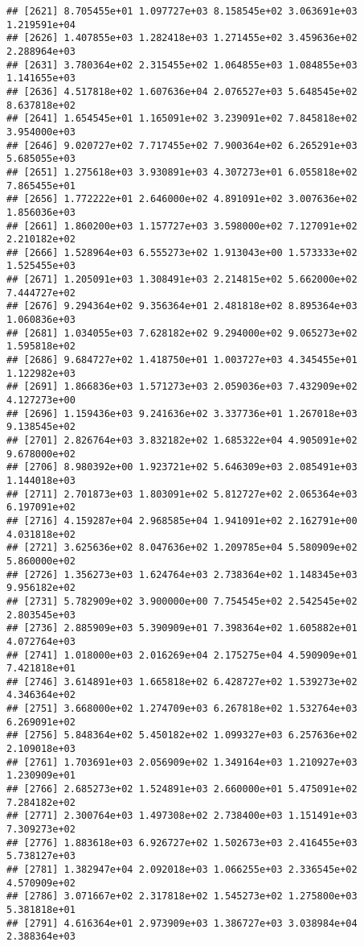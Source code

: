 \documentclass[]{article}
\begin{document}
\begin{verbatim}
## [2621] 8.705455e+01 1.097727e+03 8.158545e+02 3.063691e+03 1.219591e+04
## [2626] 1.407855e+03 1.282418e+03 1.271455e+02 3.459636e+02 2.288964e+03
## [2631] 3.780364e+02 2.315455e+02 1.064855e+03 1.084855e+03 1.141655e+03
## [2636] 4.517818e+02 1.607636e+04 2.076527e+03 5.648545e+02 8.637818e+02
## [2641] 1.654545e+01 1.165091e+02 3.239091e+02 7.845818e+02 3.954000e+03
## [2646] 9.020727e+02 7.717455e+02 7.900364e+02 6.265291e+03 5.685055e+03
## [2651] 1.275618e+03 3.930891e+03 4.307273e+01 6.055818e+02 7.865455e+01
## [2656] 1.772222e+01 2.646000e+02 4.891091e+02 3.007636e+02 1.856036e+03
## [2661] 1.860200e+03 1.157727e+03 3.598000e+02 7.127091e+02 2.210182e+02
## [2666] 1.528964e+03 6.555273e+02 1.913043e+00 1.573333e+02 1.525455e+03
## [2671] 1.205091e+03 1.308491e+03 2.214815e+02 5.662000e+02 7.444727e+02
## [2676] 9.294364e+02 9.356364e+01 2.481818e+02 8.895364e+03 1.060836e+03
## [2681] 1.034055e+03 7.628182e+02 9.294000e+02 9.065273e+02 1.595818e+02
## [2686] 9.684727e+02 1.418750e+01 1.003727e+03 4.345455e+01 1.122982e+03
## [2691] 1.866836e+03 1.571273e+03 2.059036e+03 7.432909e+02 4.127273e+00
## [2696] 1.159436e+03 9.241636e+02 3.337736e+01 1.267018e+03 9.138545e+02
## [2701] 2.826764e+03 3.832182e+02 1.685322e+04 4.905091e+02 9.678000e+02
## [2706] 8.980392e+00 1.923721e+02 5.646309e+03 2.085491e+03 1.144018e+03
## [2711] 2.701873e+03 1.803091e+02 5.812727e+02 2.065364e+03 6.197091e+02
## [2716] 4.159287e+04 2.968585e+04 1.941091e+02 2.162791e+00 4.031818e+02
## [2721] 3.625636e+02 8.047636e+02 1.209785e+04 5.580909e+02 5.860000e+02
## [2726] 1.356273e+03 1.624764e+03 2.738364e+02 1.148345e+03 9.956182e+02
## [2731] 5.782909e+02 3.900000e+00 7.754545e+02 2.542545e+02 2.803545e+03
## [2736] 2.885909e+03 5.390909e+01 7.398364e+02 1.605882e+01 4.072764e+03
## [2741] 1.018000e+03 2.016269e+04 2.175275e+04 4.590909e+01 7.421818e+01
## [2746] 3.614891e+03 1.665818e+02 6.428727e+02 1.539273e+02 4.346364e+02
## [2751] 3.668000e+02 1.274709e+03 6.267818e+02 1.532764e+03 6.269091e+02
## [2756] 5.848364e+02 5.450182e+02 1.099327e+03 6.257636e+02 2.109018e+03
## [2761] 1.703691e+03 2.056909e+02 1.349164e+03 1.210927e+03 1.230909e+01
## [2766] 2.685273e+02 1.524891e+03 2.660000e+01 5.475091e+02 7.284182e+02
## [2771] 2.300764e+03 1.497308e+02 2.738400e+03 1.151491e+03 7.309273e+02
## [2776] 1.883618e+03 6.926727e+02 1.502673e+03 2.416455e+03 5.738127e+03
## [2781] 1.382947e+04 2.092018e+03 1.066255e+03 2.336545e+02 4.570909e+02
## [2786] 3.071667e+02 2.317818e+02 1.545273e+02 1.275800e+03 5.381818e+01
## [2791] 4.616364e+01 2.973909e+03 1.386727e+03 3.038984e+04 2.388364e+03

\end{verbatim}
\end{document}
